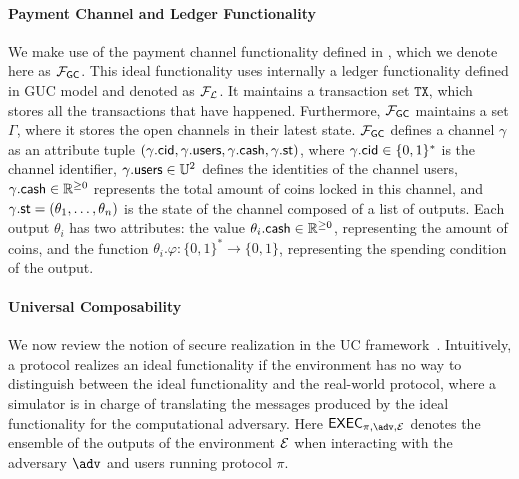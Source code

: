 \paragraph{Payment Channel and Ledger Functionality}
We make use of the payment channel functionality defined in , which we denote here as $\mathcal{F}_{\mathsf{GC}}$. This ideal 
functionality uses internally a ledger functionality defined in GUC model and denoted as 
$\mathcal{F}_{\mathcal{L}}$. It maintains a transaction set $\mathtt{TX}$, which stores all the transactions that 
have happened. Furthermore, $\mathcal{F}_{\mathsf{GC}}$ maintains a set $\Gamma$, where it stores the open 
channels in their latest state. $\mathcal{F}_{\mathsf{GC}}$ defines a channel $\gamma$ as an attribute tuple 
$(\gamma.\mathsf{cid}, \gamma.\mathsf{users}, \gamma.\mathsf{cash}, \gamma.\mathsf{st})$, where $\gamma.\mathsf{cid} \in \{0,1\}^*$ is 
the channel identifier, $\gamma.\mathsf{users} \in \mathbb{U}^2$ defines the identities of the channel 
users, $\gamma.\mathsf{cash} \in \mathbb{R}^{\geq 0}$ represents the total amount of coins locked in 
this channel, and $\gamma.\mathsf{st} = (\theta_1,\ldots,\theta_n)$ is the state of the channel 
composed of a list of outputs. Each output $\theta_i$ has two attributes: the value $\theta_i.
\mathsf{cash} \in \mathbb{R}^{\geq 0}$, representing the amount of coins, and the function $\theta_i.
\varphi \colon \{0,1\}^* \to \{0,1\}$, representing the spending condition of the output. 


\paragraph{Universal Composability}
We now review the notion of secure realization in the UC framework~\cite{canetti}. 
Intuitively, a protocol realizes an ideal functionality if the environment has no way 
to distinguish between the ideal functionality and the real-world protocol, where 
a simulator is in charge of translating the messages produced by the ideal functionality 
for the computational adversary. Here $\exec_{\pi, \adv, \dist}$ denotes the ensemble of 
the outputs of the environment $\mathcal{E}$ when interacting with the adversary $\adv$ and 
users running protocol $\pi$.

